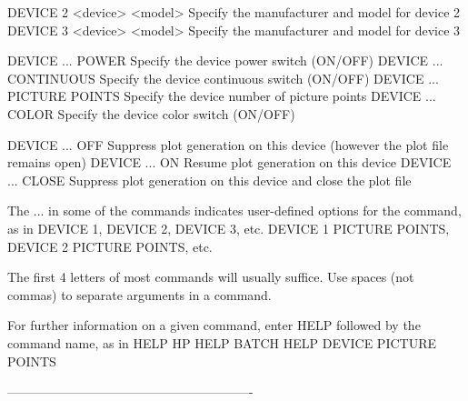    DEVICE 2 <device> <model>   Specify the manufacturer and model for
                               device 2
   DEVICE 3 <device> <model>   Specify the manufacturer and model for
                               device 3
 
   DEVICE ... POWER            Specify the device power switch (ON/OFF)
   DEVICE ... CONTINUOUS       Specify the device continuous switch
                               (ON/OFF)
   DEVICE ... PICTURE POINTS   Specify the device number of picture
                               points
   DEVICE ... COLOR            Specify the device color switch (ON/OFF)
 
   DEVICE ... OFF              Suppress plot generation on this device
                               (however the plot file remains open)
   DEVICE ... ON               Resume plot generation on this device
   DEVICE ... CLOSE            Suppress plot generation on this device
                               and close the plot file
 
The ... in some of the commands indicates user-defined options for the
command, as in
   DEVICE 1, DEVICE 2, DEVICE 3, etc.
   DEVICE 1 PICTURE POINTS, DEVICE 2 PICTURE POINTS, etc.
 
The first 4 letters of most commands will usually suffice.  Use spaces
(not commas) to separate arguments in a command.
 
For further information on a given command, enter HELP   followed by
the command name, as in
   HELP HP
   HELP BATCH
   HELP DEVICE PICTURE POINTS
 
----------------------------------------------------------
 
 
 
 
 
 
 
 
 
 
 
 
 
 
 
 
 
 
 
 
 
 
 
 
 
 
 
 
 
 
 
 
 
 
 
 
 
 
 
 
 
 
 
